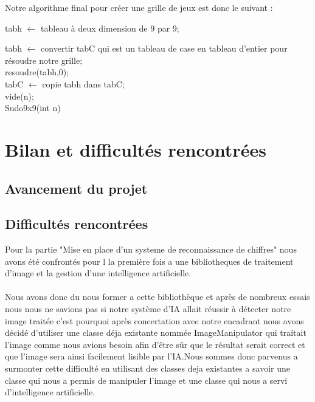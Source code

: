 \documentclass{article}
\begin{document}
Notre algorithme final pour créer une grille de jeux est donc le suivant : 

\begin{algorithm}[H]
\SetAlgoLined
{}

 tabh $\leftarrow$ tableau à deux dimension de 9 par 9;\\
 
 
 tabh $\leftarrow$ convertir tabC qui est un tableau de case en tableau d'entier pour résoudre notre grille;\\
 resoudre(tabh,0);\\
 tabC $\leftarrow$ copie tabh dans tabC;\\
 vide(n);\\

\caption{Sudo9x9(int n)}
\end{algorithm}


\newpage
\section{Bilan et difficultés rencontrées}

\subsection{Avancement du projet}





\subsection{Difficultés rencontrées}
Pour la partie "Mise en place d'un systeme de reconnaissance de chiffres" nous avons été confrontés pour l la première fois a une bibliotheques de traitement d'image et la gestion d'une intelligence artificielle.\\\\
Nous avons donc du nous former a cette bibliothèque et après de nombreux essais nous nous ne savions pas si notre système d'IA allait réussir à détecter notre image traitée c'est pourquoi après concertation avec notre encadrant nous avons décidé d'utiliser une classe déja existante nommée ImageManipulator qui traitait l'image comme nous avions besoin afin d'être sûr que le résultat serait correct et que l'image sera ainsi facilement lisible par l'IA.Nous sommes donc parvenus a surmonter cette difficulté en utilisant des classes deja existantes a savoir une classe qui nous a permis de manipuler l'image et une classe qui nous a servi d'intelligence artificielle.\\
\end{document}
